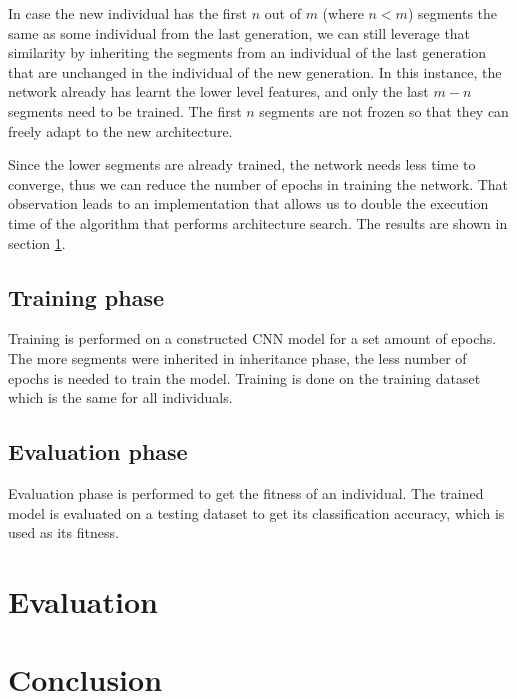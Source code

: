 \documentclass[eng]{simposium}
\begin{document}
In case the new individual has the first $n$ out of $m$ (where $n < m$) segments the same as some individual from the last generation, we can still leverage that similarity
by inheriting the segments from an individual of the last generation that are unchanged in the individual of the new generation.
In this instance, the network already has learnt the lower level features, and only the last $m-n$ segments need to be trained.
The first $n$ segments are not frozen so that they can freely adapt to the new architecture. 

Since the lower segments are already trained, the network needs less time to converge, thus we can reduce the number of epochs in training the network.
That observation leads to an implementation that allows us to double the execution time of the algorithm that performs architecture search.
The results are shown in section \ref{sec:eval}.

\subsection{Training phase}
Training is performed on a constructed CNN model for a set amount of epochs. 
The more segments were inherited in inheritance phase, the less number of epochs is needed to train the model.
Training is done on the training dataset which is the same for all individuals.

\subsection{Evaluation phase}
Evaluation phase is performed to get the fitness of an individual.
The trained model is evaluated on a testing dataset to get its classification accuracy, which is used as its fitness.


\section{Evaluation}
\label{sec:eval}



\section{Conclusion}
\end{document}
